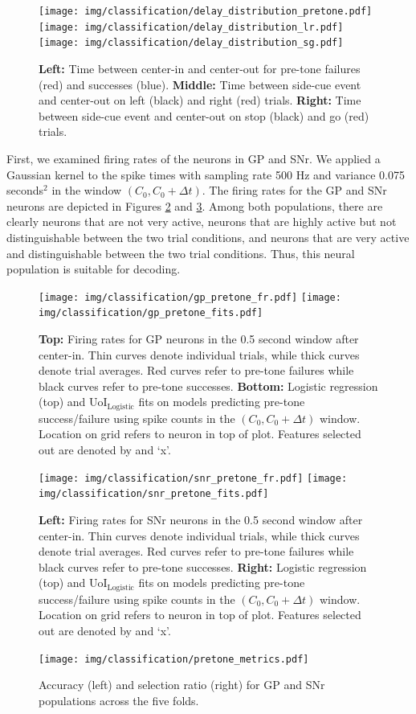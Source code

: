 \documentclass[11pt]{article}
\begin{document}
\begin{figure}[b]
	\centering
	\texttt{[image: img/classification/delay\_distribution\_pretone.pdf]}
	\texttt{[image: img/classification/delay\_distribution\_lr.pdf]}
	\texttt{[image: img/classification/delay\_distribution\_sg.pdf]}
	\caption{\textbf{Left:} Time between center-in and center-out for pre-tone failures (red) and successes (blue). \textbf{Middle:} Time between side-cue event and center-out on left (black) and right (red) trials. \textbf{Right:} Time between side-cue event and center-out on stop (black) and go (red) trials.}
	\label{fig:delays}
\end{figure}

First, we examined firing rates of the neurons in GP and SNr. We applied a Gaussian kernel to the spike times with sampling rate 500 Hz and variance 0.075 seconds$^2$ in the window $(C_0, C_0 + \Delta t)$. The firing rates for the GP and SNr neurons are depicted in Figures \ref{fig:gp_pretone} and \ref{fig:snr_pretone}. Among both populations, there are clearly neurons that are not very active, neurons that are highly active but not distinguishable between the two trial conditions, and neurons that are very active and distinguishable between the two trial conditions. Thus, this neural population is suitable for decoding.

\begin{figure}[H]
	\centering
	\texttt{[image: img/classification/gp\_pretone\_fr.pdf]}
	\texttt{[image: img/classification/gp\_pretone\_fits.pdf]}
	\caption{\textbf{Top:} Firing rates for GP neurons in the 0.5 second window after center-in. Thin curves denote individual trials, while thick curves denote trial averages. Red curves refer to pre-tone failures while black curves refer to pre-tone successes. \textbf{Bottom:} Logistic regression (top) and UoI$_{\text{Logistic}}$ fits on models predicting pre-tone success/failure using spike counts in the $(C_0, C_0+\Delta t)$ window. Location on grid refers to neuron in top of plot. Features selected out are denoted by and `x'.}
	\label{fig:gp_pretone}
\end{figure}

\begin{figure}[H]
	\centering
	\texttt{[image: img/classification/snr\_pretone\_fr.pdf]}
	\texttt{[image: img/classification/snr\_pretone\_fits.pdf]}
	\caption{\textbf{Left:} Firing rates for SNr neurons in the 0.5 second window after center-in. Thin curves denote individual trials, while thick curves denote trial averages. Red curves refer to pre-tone failures while black curves refer to pre-tone successes. \textbf{Right:} Logistic regression (top) and UoI$_{\text{Logistic}}$ fits on models predicting pre-tone success/failure using spike counts in the $(C_0, C_0+\Delta t)$ window. Location on grid refers to neuron in top of plot. Features selected out are denoted by and `x'.}
	\label{fig:snr_pretone}
\end{figure}
\begin{figure}[H]
	\centering
	\texttt{[image: img/classification/pretone\_metrics.pdf]}
	\caption{Accuracy (left) and selection ratio (right) for GP and SNr populations across the five folds.}
	\label{fig:pretone_metrics}
\end{figure}
\end{document}
